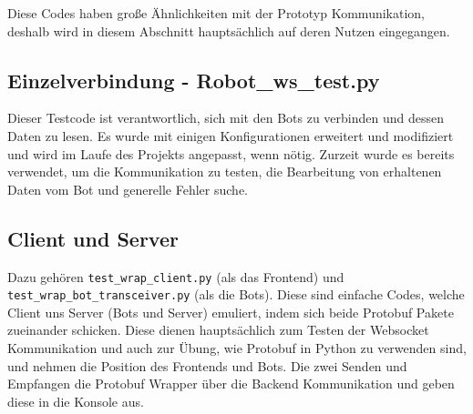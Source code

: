 Diese Codes haben große Ähnlichkeiten mit der Prototyp Kommunikation, 
deshalb wird in diesem Abschnitt hauptsächlich auf deren Nutzen eingegangen.

\subsection{Einzelverbindung - Robot\_ws\_test.py}
Dieser Testcode ist verantwortlich, sich mit den Bots zu verbinden 
und dessen Daten zu lesen.
Es wurde mit einigen Konfigurationen erweitert und modifiziert 
und wird im Laufe des Projekts angepasst, wenn nötig.
Zurzeit wurde es bereits verwendet, um die Kommunikation zu testen, 
die Bearbeitung von erhaltenen Daten vom Bot und generelle Fehler suche.

\subsection{Client und Server}
Dazu gehören \texttt{test\_wrap\_client.py} (als das Frontend) 
und \texttt{test\_wrap\_bot\_transceiver.py} (als die Bots).
Diese sind einfache Codes, welche Client uns Server (Bots und Server) emuliert, 
indem sich beide Protobuf Pakete zueinander schicken. 
Diese dienen hauptsächlich zum Testen der Websocket Kommunikation 
und auch zur Übung, wie Protobuf in Python zu verwenden sind, 
und nehmen die Position des Frontends und Bots.
Die zwei Senden und Empfangen die Protobuf Wrapper über die Backend Kommunikation 
und geben diese in die Konsole aus.
